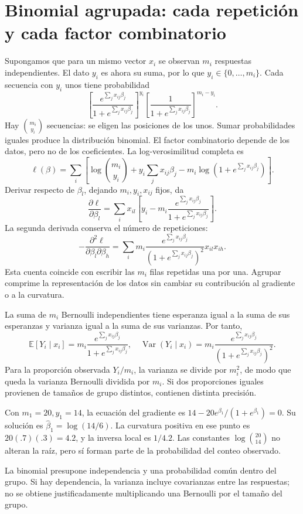 \documentclass[11pt,a4paper]{article}
\newcommand{\E}{\mathbb E}
\DeclareMathOperator{\Var}{Var}
\begin{document}
\section{Binomial agrupada: cada repetición y cada factor combinatorio}\label{logit71}
Supongamos que para un mismo vector \(x_i\) se observan \(m_i\)
respuestas independientes. El dato \(y_i\) es ahora su suma,
por lo que \(y_i\in\{0,\ldots,m_i\}\).
Cada secuencia con \(y_i\) unos tiene probabilidad
\[
\left[\frac{e^{\sum_jx_{ij}\beta_j}}
{1+e^{\sum_jx_{ij}\beta_j}}\right]^{y_i}
\left[\frac1{1+e^{\sum_jx_{ij}\beta_j}}\right]^{m_i-y_i}.
\]
Hay \(\binom{m_i}{y_i}\) secuencias: se eligen las posiciones de los unos.
Sumar probabilidades iguales produce la distribución binomial.
El factor combinatorio depende de los datos, pero no de los coeficientes.
La log-verosimilitud completa es
\[
\ell(\beta)=\sum_i\left[
\log\binom{m_i}{y_i}
+y_i\sum_jx_{ij}\beta_j
-m_i\log(1+e^{\sum_jx_{ij}\beta_j})\right].
\]
Derivar respecto de \(\beta_l\), dejando \(m_i,y_i,x_{ij}\) fijos, da
\[
\frac{\partial\ell}{\partial\beta_l}
=\sum_i x_{il}\left[
y_i-m_i\frac{e^{\sum_jx_{ij}\beta_j}}
{1+e^{\sum_jx_{ij}\beta_j}}\right].
\]
La segunda derivada conserva el número de repeticiones:
\[
-\frac{\partial^2\ell}{\partial\beta_l\partial\beta_h}
=\sum_i m_i
\frac{e^{\sum_jx_{ij}\beta_j}}
{(1+e^{\sum_jx_{ij}\beta_j})^2}x_{il}x_{ih}.
\]
Esta cuenta coincide con escribir las \(m_i\) filas repetidas
una por una. Agrupar comprime la representación de los datos
sin cambiar su contribución al gradiente o a la curvatura.

La suma de \(m_i\) Bernoulli independientes tiene esperanza igual
a la suma de sus esperanzas y varianza igual a la suma de sus
varianzas. Por tanto,
\[
\E[Y_i\mid x_i]=m_i\frac{e^{\sum_jx_{ij}\beta_j}}{1+e^{\sum_jx_{ij}\beta_j}},
\quad
\Var(Y_i\mid x_i)=m_i\frac{e^{\sum_jx_{ij}\beta_j}}
{(1+e^{\sum_jx_{ij}\beta_j})^2}.
\]
Para la proporción observada \(Y_i/m_i\), la varianza se divide
por \(m_i^2\), de modo que queda la varianza Bernoulli dividida
por \(m_i\). Si dos proporciones iguales provienen de tamaños
de grupo distintos, contienen distinta precisión.

\begin{ejemplo}
Con \(m_1=20,y_1=14\), la ecuación del gradiente es
\(14-20e^{\beta_1}/(1+e^{\beta_1})=0\).
Su solución es \(\widehat\beta_1=\log(14/6)\).
La curvatura positiva en ese punto es
\(20(.7)(.3)=4.2\), y la inversa local es \(1/4.2\).
Las constantes \(\log\binom{20}{14}\) no alteran la raíz,
pero sí forman parte de la probabilidad del conteo observado.
\end{ejemplo}
La binomial presupone independencia y una probabilidad común
dentro del grupo. Si hay dependencia, la varianza incluye
covarianzas entre las respuestas; no se obtiene justificadamente
multiplicando una Bernoulli por el tamaño del grupo.
\end{document}
